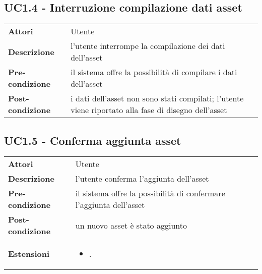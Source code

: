 \subsection{UC1.4 - Interruzione compilazione dati asset}
\label{sssec:UC1.4}
\def\arraystretch{1.5}
\begin{tabularx}{\textwidth}{l|p{}}
\rowcolor{I} \multicolumn{2}{c}{\color{white}\textbf{UC1.4 - Interruzione compilazione dati asset}} \\
\toprule
\endhead
\textbf{Attori} & Utente\\
\textbf{Descrizione} & l'utente interrompe la compilazione dei dati dell'asset\\
\textbf{Pre-condizione} & il sistema offre la possibilità di compilare i dati dell'asset\\
\textbf{Post-condizione} & i dati dell'asset non sono stati compilati; l'utente viene riportato alla fase di disegno dell'asset\\
\bottomrule
\end{tabularx}
\subsection{UC1.5 - Conferma aggiunta asset}
\label{sssec:UC1.5}
\def\arraystretch{1.5}
\begin{tabularx}{\textwidth}{l|p{}}
\rowcolor{I} \multicolumn{2}{c}{\color{white}\textbf{UC1.5 - Conferma aggiunta asset}} \\
\toprule
\endhead
\textbf{Attori} & Utente\\
\textbf{Descrizione} & l'utente conferma l'aggiunta dell'asset\\
\textbf{Pre-condizione} & il sistema offre la possibilità di confermare l'aggiunta dell'asset\\
\textbf{Post-condizione} & un nuovo asset è stato aggiunto\\
\textbf{Estensioni} & \vspace{-1.2em}\begin{itemize}[leftmargin=*,noitemsep,nosep]
\item \nameref{sssec:UC1.6}.
\end{itemize}\\
\bottomrule
\end{tabularx}
